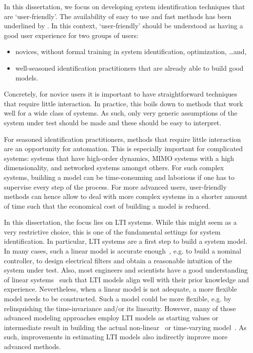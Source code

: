 In this dissertation, we focus on developing system identification techniques that are `user-friendly'.
The availability of easy to use and fast methods has been underlined by \citet{Gevers2011Challenges}.
In this context, `user-friendly' should be understood as having a good user experience for two groups of users:
\begin{itemize}
  \item novices, without formal training in system identification, optimization, \ldots and,
  \item well-seasoned identification practitioners that are already able to build good models.
\end{itemize}
Concretely, for novice users it is important to have straightforward techniques that require little interaction.
In practice, this boils down to methods that work well for a wide class of systems.
As such, only very generic assumptions of the system under test should be made and these should be easy to interpret.

For seasoned identification practitioners, methods that require little interaction are an opportunity for automation.
This is especially important for complicated systems: systems that have high-order dynamics, \gls{MIMO} systems with a high dimensionality, and networked systems amongst others.
For such complex systems, building a model can be time-consuming and laborious if one has to supervise every step of the process.
For more advanced users, user-friendly methods can hence allow to deal with more complex systems in a shorter amount of time such that the economical cost of building a model is reduced.

In this dissertation, the focus lies on \gls{LTI} systems.
While this might seem as a very restrictive choice, this is one of the fundamental settings for system identification.
In particular, \gls{LTI} systems are a first step to build a system model.
In many cases, such a linear model is accurate enough~\citep{Schoukens2004}, e.g. to build a nominal controller, to design electrical filters and obtain a reasonable intuition of the system under test.
Also, most engineers and scientists have a good understanding of linear systems~\citep{Oppenheim1996,Mandal2007,Kailath1980} such that \gls{LTI} models align well with their prior knowledge and experience.
Nevertheless, when a linear model is not adequate, a more flexible model needs to be constructed.
Such a model could be more flexible, e.g. by relinquishing the time-invariance and/or its linearity.
However, many of those advanced modeling approaches employ \gls{LTI} models as starting values or intermediate result in building the actual non-linear~\citep{Giri2010} or time-varying model~\citep{Lataire2012,Louarroudi2014}.
As such, improvements in estimating \gls{LTI} models also indirectly improve more advanced methods.


